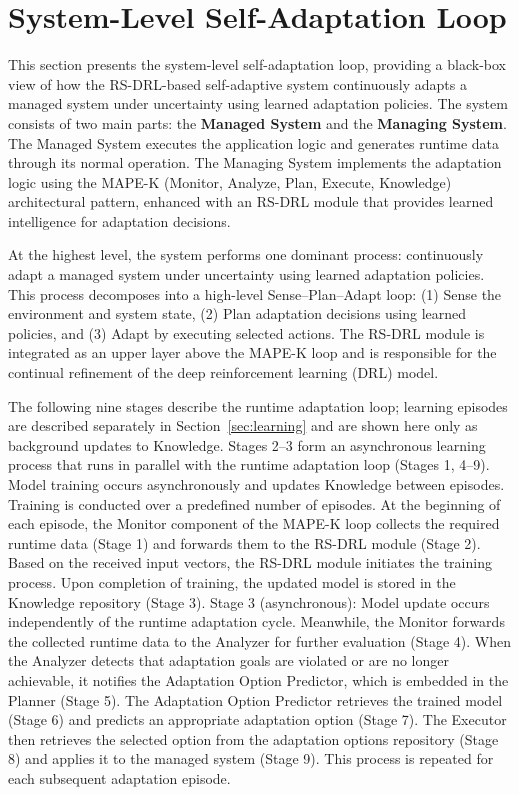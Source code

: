 \documentclass[11pt,a4paper]{article}
\begin{document}

\section{System-Level Self-Adaptation Loop}
\label{sec:system-loop}

This section presents the system-level self-adaptation loop, providing a black-box view of how the RS-DRL-based self-adaptive system continuously adapts a managed system under uncertainty using learned adaptation policies. The system consists of two main parts: the \textbf{Managed System} and the \textbf{Managing System}. The Managed System executes the application logic and generates runtime data through its normal operation. The Managing System implements the adaptation logic using the MAPE-K (Monitor, Analyze, Plan, Execute, Knowledge) architectural pattern, enhanced with an RS-DRL module that provides learned intelligence for adaptation decisions.

At the highest level, the system performs one dominant process: continuously adapt a managed system under uncertainty using learned adaptation policies. This process decomposes into a high-level Sense--Plan--Adapt loop: (1) Sense the environment and system state, (2) Plan adaptation decisions using learned policies, and (3) Adapt by executing selected actions. The RS-DRL module is integrated as an upper layer above the MAPE-K loop and is responsible for the continual refinement of the deep reinforcement learning (DRL) model.

The following nine stages describe the runtime adaptation loop; learning episodes are described separately in Section~\ref{sec:learning} and are shown here only as background updates to Knowledge. Stages 2--3 form an asynchronous learning process that runs in parallel with the runtime adaptation loop (Stages 1, 4--9). Model training occurs asynchronously and updates Knowledge between episodes. Training is conducted over a predefined number of episodes. At the beginning of each episode, the Monitor component of the MAPE-K loop collects the required runtime data (Stage 1) and forwards them to the RS-DRL module (Stage 2). Based on the received input vectors, the RS-DRL module initiates the training process. Upon completion of training, the updated model is stored in the Knowledge repository (Stage 3). Stage 3 (asynchronous): Model update occurs independently of the runtime adaptation cycle. Meanwhile, the Monitor forwards the collected runtime data to the Analyzer for further evaluation (Stage 4). When the Analyzer detects that adaptation goals are violated or are no longer achievable, it notifies the Adaptation Option Predictor, which is embedded in the Planner (Stage 5). The Adaptation Option Predictor retrieves the trained model (Stage 6) and predicts an appropriate adaptation option (Stage 7). The Executor then retrieves the selected option from the adaptation options repository (Stage 8) and applies it to the managed system (Stage 9). This process is repeated for each subsequent adaptation episode.
\end{document}
